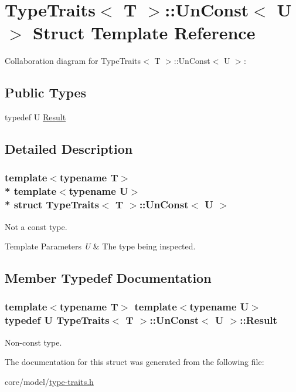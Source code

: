\hypertarget{structTypeTraits_1_1UnConst}{}\section{Type\+Traits$<$ T $>$\+:\+:Un\+Const$<$ U $>$ Struct Template Reference}
\label{structTypeTraits_1_1UnConst}


Collaboration diagram for Type\+Traits$<$ T $>$\+:\+:Un\+Const$<$ U $>$\+:
\subsection*{Public Types}
\begin{DoxyCompactItemize}
\item 
typedef U \hyperlink{structTypeTraits_1_1UnConst_a3811af872c9e1cfe69332667f0f35ca6}{Result}
\end{DoxyCompactItemize}


\subsection{Detailed Description}
\subsubsection*{template$<$typename T$>$\\*
template$<$typename U$>$\\*
struct Type\+Traits$<$ T $>$\+::\+Un\+Const$<$ U $>$}

Not a const type. 
\begin{DoxyTemplParams}{Template Parameters}
{\em U} & The type being inspected. \\
\hline
\end{DoxyTemplParams}


\subsection{Member Typedef Documentation}
\subsubsection[{\texorpdfstring{Result}{Result}}]{\setlength{\rightskip}{0pt plus 5cm}template$<$typename T$>$ template$<$typename U$>$ typedef U {\bf Type\+Traits}$<$ T $>$\+::{\bf Un\+Const}$<$ U $>$\+::{\bf Result}}\hypertarget{structTypeTraits_1_1UnConst_a3811af872c9e1cfe69332667f0f35ca6}{}\label{structTypeTraits_1_1UnConst_a3811af872c9e1cfe69332667f0f35ca6}
Non-\/const type. 

The documentation for this struct was generated from the following file\+:\begin{DoxyCompactItemize}
\item 
core/model/\hyperlink{type-traits_8h}{type-\/traits.\+h}\end{DoxyCompactItemize}
